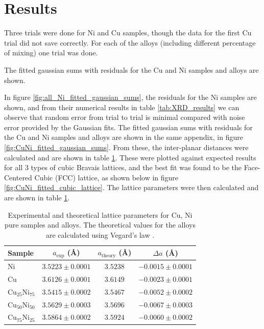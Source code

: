 \documentclass[12pt]{article}
\begin{document}
\section{Results}\label{sec:res}

Three trials were done for Ni and Cu samples, though the data for the first Cu trial did not save correctly. 
For each of the alloys (including different percentage of mixing) 
one trial was done. 

The fitted gaussian sums with residuals for the Cu and Ni samples and alloys are shown.

In figure \ref{fig:all_Ni_fitted_gaussian_sums}, the residuals for the Ni samples are shown, and from
their numerical results in table \ref{tab:XRD_results} we can observe that random error from trial to trial is minimal compared
with noise error provided by the Gaussian fits. The fitted gaussian sums with residuals for the Cu and Ni samples and alloys are shown
in the same appendix, in figure \ref{fig:CuNi_fitted_gaussian_sums}. From these, the inter-planar distances were
calculated and are shown in table \ref{tab:CuNi_lattice_parameters}. These were plotted against expected results for all 3
types of cubic Bravais lattices, and the best fit was found to be the Face-Centered Cubic (FCC) lattice, as shown
below in figure \ref{fig:CuNi_fitted_cubic_lattice}. The lattice parameters were then calculated and are shown
in table \ref{tab:CuNi_lattice_parameters}.



\begin{table}[H]
\centering
\begin{tabular}{lccc}
\hline
\hline
Sample & $a_{\mathrm{exp}}$ (\AA) & $a_{\mathrm{theory}}$ (\AA) & $\Delta a$ (\AA) \\
\hline
Ni & $3.5223 \pm 0.0001$ & $3.5238$ & $-0.0015 \pm 0.0001$ \\
Cu & $3.6126 \pm 0.0001$ & $3.6149$ & $-0.0023 \pm 0.0001$ \\
Cu$_{25}$Ni$_{75}$ & $3.5415 \pm 0.0002$ & $3.5467$ & $-0.0052 \pm 0.0002$ \\
Cu$_{50}$Ni$_{50}$ & $3.5629 \pm 0.0003$ & $3.5696$ & $-0.0067 \pm 0.0003$ \\
Cu$_{75}$Ni$_{25}$ & $3.5864 \pm 0.0002$ & $3.5924$ & $-0.0060 \pm 0.0002$ \\
\hline
\hline
\end{tabular}
\caption{Experimental and theoretical lattice parameters for Cu, Ni pure samples and alloys. The theoretical values for the alloys are calculated using Vegard's law	.}
\label{tab:CuNi_lattice_parameters}
\end{table}
\end{document}

